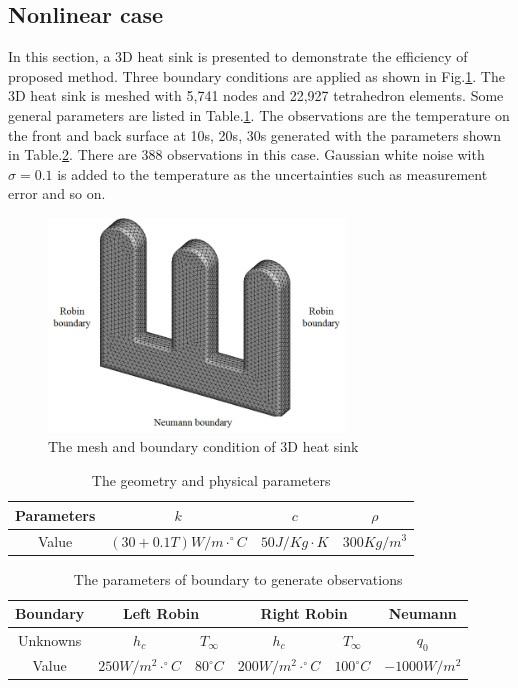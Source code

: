 \documentclass[review]{elsarticle}
\begin{document}
\subsection{Nonlinear case}
In this section, a 3D heat sink is presented to demonstrate the efficiency of proposed method. Three boundary conditions are applied as shown in Fig.\ref{fig:3Dheatsink}. The 3D heat sink is meshed with 5,741 nodes and 22,927 tetrahedron elements. Some general parameters are listed in Table.\ref{tab:para_case2}. The observations are the temperature on the front and back surface at 10s, 20s, 30s generated with the parameters shown in Table.\ref{tab:unkownpara}. There are 388 observations in this case. Gaussian white noise with $\sigma=0.1$ is added to the temperature as the uncertainties such as measurement error and so on. 

\begin{figure}
    \centering
    \includegraphics[width=0.7\textwidth]{fig/3Dheatsink.png}
    \caption{The mesh and boundary condition of 3D heat sink}
    \label{fig:3Dheatsink}
\end{figure}

\begin{table}[]
    \centering
    \caption{The geometry and physical parameters}
    \begin{tabular}{c c c c}
        \hline
         Parameters &  $k$ & $c$ & $\rho$\\
         \hline
         Value &  $(30+0.1T)W/m\cdot ^{\circ} C$ & $50 J/Kg \cdot K$ & $300 Kg/m^3$\\
         \hline
    \end{tabular}
    \label{tab:para_case2}
\end{table}

\begin{table}[]
    \centering
    \caption{The parameters of boundary to generate observations}
    \begin{tabular}{c c c c c c}
        \hline
         Boundary &  \multicolumn{2}{c}{ Left Robin } & \multicolumn{2}{c}{Right Robin } & Neumann \\
         \hline
         Unknowns &  $h_c$ & $T_\infty$ & $h_c$ & $T_\infty$ & $q_0$\\
         Value  &  $250 W/m^2 \cdot ^{\circ}C$ & $80^{\circ}C$ & $200 W/m^2 \cdot^{\circ}C$ & $100^{\circ}C$ & $-1000W/m^2$\\
         \hline
    \end{tabular}
    \label{tab:unkownpara}
\end{table}
\end{document}

